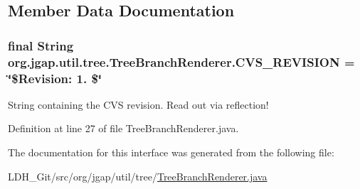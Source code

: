 \subsection{Member Data Documentation}
\hypertarget{interfaceorg_1_1jgap_1_1util_1_1tree_1_1_tree_branch_renderer_abf5dfd45cb42951f5e8917c449b3c82e}{
\subsubsection[{C\-V\-S\-\_\-\-R\-E\-V\-I\-S\-I\-O\-N}]{\setlength{\rightskip}{0pt plus 5cm}final String org.\-jgap.\-util.\-tree.\-Tree\-Branch\-Renderer.\-C\-V\-S\-\_\-\-R\-E\-V\-I\-S\-I\-O\-N = \char`\"{}\$Revision\-: 1. \$\char`\"{}\hspace{0.3cm}{\ttfamily [static]}}}\label{interfaceorg_1_1jgap_1_1util_1_1tree_1_1_tree_branch_renderer_abf5dfd45cb42951f5e8917c449b3c82e}
String containing the C\-V\-S revision. Read out via reflection! 

Definition at line 27 of file Tree\-Branch\-Renderer.\-java.



The documentation for this interface was generated from the following file\-:\begin{DoxyCompactItemize}
\item 
L\-D\-H\-\_\-\-Git/src/org/jgap/util/tree/\hyperlink{_tree_branch_renderer_8java}{Tree\-Branch\-Renderer.\-java}\end{DoxyCompactItemize}
